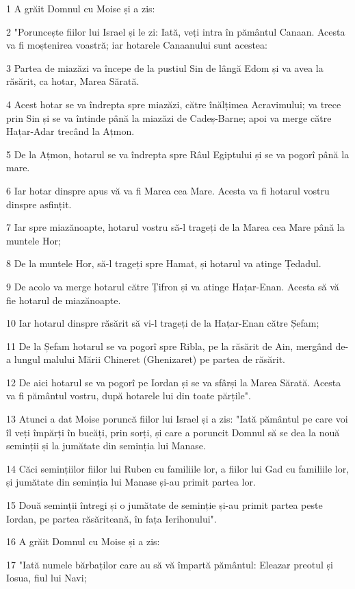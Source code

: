 \par 1 A grăit Domnul cu Moise și a zis:
\par 2 "Poruncește fiilor lui Israel și le zi: Iată, veți intra în pământul Canaan. Acesta va fi moștenirea voastră; iar hotarele Canaanului sunt acestea:
\par 3 Partea de miazăzi va începe de la pustiul Sin de lângă Edom și va avea la răsărit, ca hotar, Marea Sărată.
\par 4 Acest hotar se va îndrepta spre miazăzi, către înălțimea Acravimului; va trece prin Sin și se va întinde până la miazăzi de Cadeș-Barne; apoi va merge către Hațar-Adar trecând la Ațmon.
\par 5 De la Ațmon, hotarul se va îndrepta spre Râul Egiptului și se va pogorî până la mare.
\par 6 Iar hotar dinspre apus vă va fi Marea cea Mare. Acesta va fi hotarul vostru dinspre asfințit.
\par 7 Iar spre miazănoapte, hotarul vostru să-l trageți de la Marea cea Mare până la muntele Hor;
\par 8 De la muntele Hor, să-l trageți spre Hamat, și hotarul va atinge Țedadul.
\par 9 De acolo va merge hotarul către Țifron și va atinge Hațar-Enan. Acesta să vă fie hotarul de miazănoapte.
\par 10 Iar hotarul dinspre răsărit să vi-l trageți de la Hațar-Enan către Șefam;
\par 11 De la Șefam hotarul se va pogorî spre Ribla, pe la răsărit de Ain, mergând de-a lungul malului Mării Chineret (Ghenizaret) pe partea de răsărit.
\par 12 De aici hotarul se va pogorî pe Iordan și se va sfârși la Marea Sărată. Acesta va fi pământul vostru, după hotarele lui din toate părțile".
\par 13 Atunci a dat Moise poruncă fiilor lui Israel și a zis: "Iată pământul pe care voi îl veți împărți în bucăți, prin sorți, și care a poruncit Domnul să se dea la nouă seminții și la jumătate din seminția lui Manase.
\par 14 Căci semințiilor fiilor lui Ruben cu familiile lor, a fiilor lui Gad cu familiile lor, și jumătate din seminția lui Manase și-au primit partea lor.
\par 15 Două seminții întregi și o jumătate de seminție și-au primit partea peste Iordan, pe partea răsăriteană, în fața Ierihonului".
\par 16 A grăit Domnul cu Moise și a zis:
\par 17 "Iată numele bărbaților care au să vă împartă pământul: Eleazar preotul și Iosua, fiul lui Navi;
